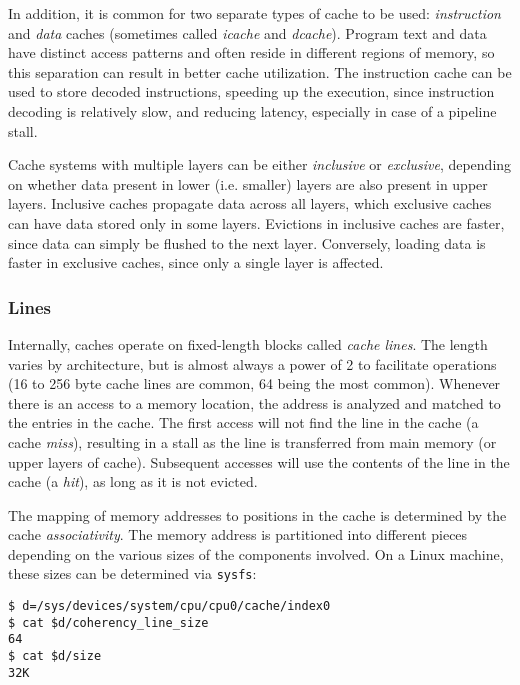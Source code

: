 In addition, it is common for two separate types of cache to be used:
\textit{instruction} and \textit{data} caches (sometimes called \textit{icache}
and \textit{dcache}).  Program text and data have distinct access patterns and
often reside in different regions of memory, so this separation can result in
better cache utilization.  The instruction cache can be used to store decoded
instructions, speeding up the execution, since instruction decoding is
relatively slow, and reducing latency, especially in case of a pipeline stall.

Cache systems with multiple layers can be either \textit{inclusive} or
\textit{exclusive}, depending on whether data present in lower (i.e. smaller)
layers are also present in upper layers.  Inclusive caches propagate data across
all layers, which exclusive caches can have data stored only in some layers.
Evictions in inclusive caches are faster, since data can simply be flushed to
the next layer.  Conversely, loading data is faster in exclusive caches, since
only a single layer is affected.

\subsubsection{Lines}

Internally, caches operate on fixed-length blocks called \textit{cache lines}.
The length varies by architecture, but is almost always a power of 2 to
facilitate operations (16 to 256 byte cache lines are common, 64 being the most
common).  Whenever there is an access to a memory location, the address is
analyzed and matched to the entries in the cache.  The first access will not
find the line in the cache (a cache \textit{miss}), resulting in a stall as the
line is transferred from main memory (or upper layers of cache).  Subsequent
accesses will use the contents of the line in the cache (a \textit{hit}), as
long as it is not evicted.

The mapping of memory addresses to positions in the cache is determined by the
cache \textit{associativity}.  The memory address is partitioned into different
pieces depending on the various sizes of the components involved.  On a Linux
machine, these sizes can be determined via \texttt{sysfs}:

\begin{lstlisting}
$ d=/sys/devices/system/cpu/cpu0/cache/index0
$ cat $d/coherency_line_size
64
$ cat $d/size
32K
\end{lstlisting}

